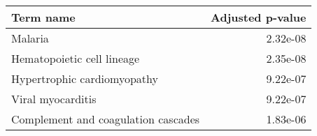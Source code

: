 \begin{tabular}{lr}
\toprule
                          Term name &  Adjusted p-value \\
\midrule
                            Malaria &          2.32e-08 \\
         Hematopoietic cell lineage &          2.35e-08 \\
        Hypertrophic cardiomyopathy &          9.22e-07 \\
                  Viral myocarditis &          9.22e-07 \\
Complement and coagulation cascades &          1.83e-06 \\
\bottomrule
\end{tabular}
